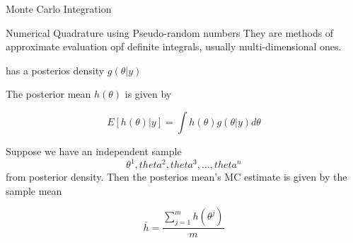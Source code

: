 Monte Carlo Integration

Numerical Quadrature using Pseudo-random numbers
They are methods of approximate evaluation opf definite integrals, usually multi-dimensional ones.

\theta has a posterios density $g(\theta |y)$

The posterior mean $h(\theta)$ is given by

\[E[h(\theta)|y]  = \int h(\theta) g(\theta|y) d \theta\]

Suppose we have an independent sample 
\[ \theta^{1}, theta^{2}, theta^{3}, \ldots, theta^{n}\]
from posterior density. Then the posterios mean's MC estimate is given by the sample mean

\[ \bar{h}  = \frac{\sum^{m}_{j=1} h(\theta^j) }{m} \]
